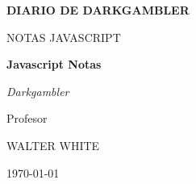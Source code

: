 \begin{titlepage}
	\centering
	
	{\scshape\LARGE \textbf{DIARIO DE DARKGAMBLER} \par}
	\vspace{1cm}
	{\scshape\Large NOTAS JAVASCRIPT\par}
	\vspace{1.5cm}
	{\huge\bfseries \textcolor{azulSection}{Javascript Notas}\par}
	\vspace{2cm}
	       {\Large\itshape Darkgambler\par}
	\vfill
	Profesor\par
	WALTER WHITE

	\vfill

	{\large \today\par}
\end{titlepage}
